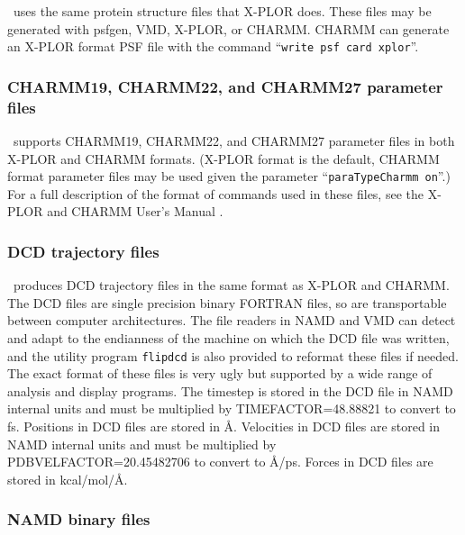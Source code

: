 \NAMD\ uses the same protein structure files that X-PLOR does.
These files may be generated with psfgen, VMD, X-PLOR, or CHARMM.
CHARMM can generate an X-PLOR format PSF file with the command
``{\tt write psf card xplor}''.

\subsubsection{CHARMM19, CHARMM22, and CHARMM27 parameter files}

\NAMD\ supports CHARMM19, CHARMM22, and CHARMM27 parameter files in both
X-PLOR and CHARMM formats.
(X-PLOR format is the default, CHARMM format parameter files
may be used given the parameter ``{\tt paraTypeCharmm on}''.)
For a full description of the format of commands 
used in these files, see the X-PLOR and CHARMM User's Manual 
.  

\subsubsection{DCD trajectory files}

\NAMD\ produces DCD trajectory files in the same format as 
X-PLOR and CHARMM.  
The DCD files are single precision binary FORTRAN files, 
so are transportable between computer architectures.  
The file readers in NAMD and VMD can detect and
adapt to the endianness of the machine on which the DCD
file was written, and the utility program {\tt flipdcd}
is also provided to reformat these files if needed.
The exact format of these files is very ugly but supported by 
a wide range of analysis and display programs.  
The timestep is stored in the DCD file in NAMD internal units
and must be multiplied by TIMEFACTOR=48.88821 to convert to fs.
Positions in DCD files are stored in \AA.
Velocities in DCD files are stored in NAMD internal
units and must be multiplied by PDBVELFACTOR=20.45482706
to convert to \AA/ps.
Forces in DCD files are stored in kcal/mol/\AA.

\subsubsection{NAMD binary files}

